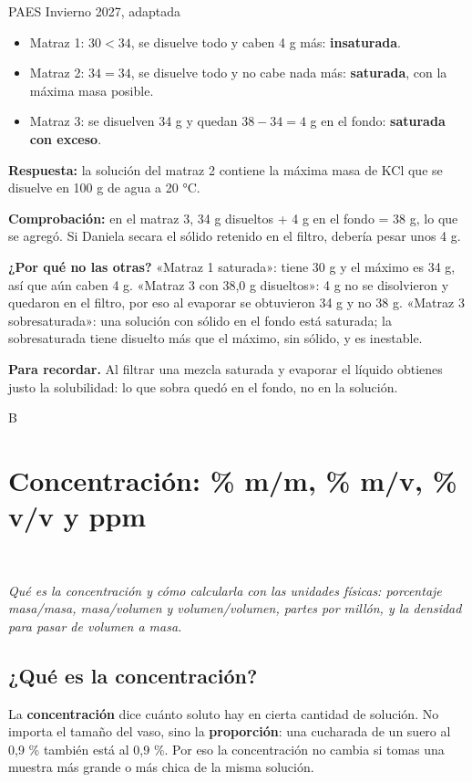 \begin{elejemplo}{PAES Invierno 2027, adaptada}
{ 
\begin{itemize}
  \item Matraz 1: $30 < 34$, se disuelve todo y caben 4 g más: \textbf{insaturada}.
  \item Matraz 2: $34 = 34$, se disuelve todo y no cabe nada más: \textbf{saturada}, con la máxima masa posible.
  \item Matraz 3: se disuelven 34 g y quedan $38 - 34 = 4$ g en el fondo: \textbf{saturada con exceso}.
\end{itemize}
 

\textbf{Respuesta:} la solución del matraz 2 contiene la máxima masa de KCl que se disuelve en 100 g de agua a 20 °C.

 

\textbf{Comprobación:} en el matraz 3, 34 g disueltos + 4 g en el fondo = 38 g, lo que se agregó. Si Daniela secara el sólido retenido en el filtro, debería pesar unos 4 g.

 

\textbf{¿Por qué no las otras?} «Matraz 1 saturada»: tiene 30 g y el máximo es 34 g, así que aún caben 4 g. «Matraz 3 con 38,0 g disueltos»: 4 g no se disolvieron y quedaron en el filtro, por eso al evaporar se obtuvieron 34 g y no 38 g. «Matraz 3 sobresaturada»: una solución con sólido en el fondo está saturada; la sobresaturada tiene disuelto más que el máximo, sin sólido, y es inestable.

\textbf{\color{cienciaD}Para recordar.} Al filtrar una mezcla saturada y evaporar el líquido obtienes justo la solubilidad: lo que sobra quedó en el fondo, no en la solución.}{B}
\end{elejemplo}

\section[Concentración: \% m/m, \% m/v, \% v/v y ppm]{Concentración: \% m/m, \% m/v, \% v/v y ppm}
\modcomun\ \ {\color{gris}\itshape Qué es la concentración y cómo calcularla con las unidades físicas: porcentaje masa/masa, masa/volumen y volumen/volumen, partes por millón, y la densidad para pasar de volumen a masa.\par}
\subsection{¿Qué es la concentración?}
La \textbf{concentración} dice cuánto soluto hay en cierta cantidad de solución. No importa el tamaño del vaso, sino la \textbf{proporción}: una cucharada de un suero al 0,9 \% también está al 0,9 \%. Por eso la concentración no cambia si tomas una muestra más grande o más chica de la misma solución.

